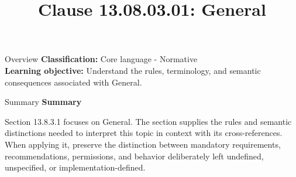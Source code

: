 \documentclass[10pt,letterpaper]{article}
\title{Clause 13.08.03.01: General}
\author{}
\date{}
\begin{document}
\maketitle
\begin{CornellOverviewBox}{Overview}
\textbf{Classification:} Core language - Normative\\[2pt]
\textbf{Learning objective:} Understand the rules, terminology, and semantic consequences associated with General.
\end{CornellOverviewBox}\begin{CornellSummaryBox}{Summary}
{\sffamily\bfseries\color{Accent} Summary}\par\vspace{3pt}Section 13.8.3.1 focuses on General. The section supplies the rules and semantic distinctions needed to interpret this topic in context with its cross-references. When applying it, preserve the distinction between mandatory requirements, recommendations, permissions, and behavior deliberately left undefined, unspecified, or implementation-defined.
\end{CornellSummaryBox}
\end{document}
